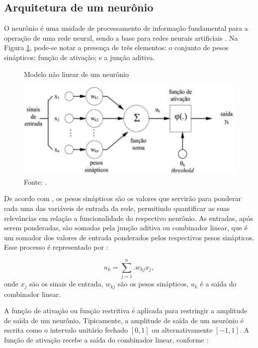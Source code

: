 \subsection{Arquitetura de um neurônio}
O neurônio é uma unidade de processamento de informação fundamental para a operação de uma rede neural, sendo a base para redes neurais artificiais \cite{haykin}. Na Figura \ref{fig:neuronio}, pode-se notar a presença de três elementos: o conjunto de pesos sinápticos; função de ativação; e a junção aditiva.
\begin{figure}[H]
	\vspace{4mm}
	\centering
	\caption{Modelo não linear de um neurônio}
	\label{fig:neuronio}
	\includegraphics[scale=0.35]{imagens/neuronio}
	\caption*{Fonte: .}
\end{figure}

De acordo com , os pesos sinápticos são os valores que servirão para ponderar cada uma das variáveis de entrada da rede, permitindo quantificar as suas relevâncias em relação a funcionalidade do respectivo neurônio. As entradas, após serem ponderadas, são somadas pela junção aditiva ou combinador linear, que é um somador dos valores de entrada ponderados pelos respectivos pesos sinápticos. Esse processo é representado por \cite{haykin}:

\begin{equation}
	u_k = 	\sum_{j=1}^{n}.w_{kj}x_j,
\end{equation}
onde $x_j$ são os sinais de entrada, $w_{kj}$ são os pesos sinápticos, $u_k$ é a saída do combinador linear.

A função de ativação ou função restritiva é aplicada para restringir a amplitude de saída de um neurônio. Tipicamente, a amplitude de saída de um neurônio é escrita como o intervalo unitário fechado $[0, 1]$ ou alternativamente $[-1, 1]$. A função de ativação recebe a saída do combinador linear, conforme \cite{haykin}:

